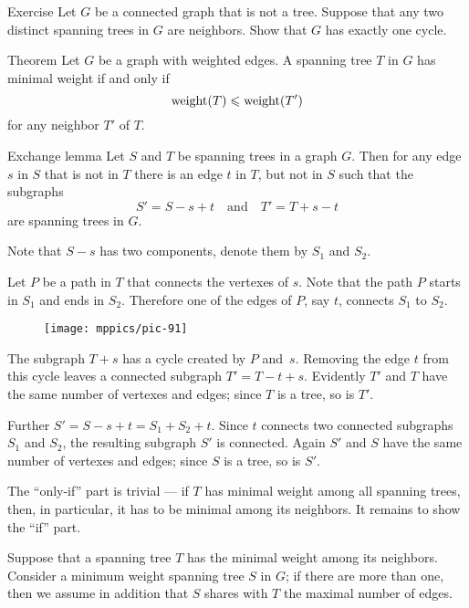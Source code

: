 \begin{thm}{Exercise}
Let $G$ be a connected graph that is not a tree.
Suppose that any two distinct spanning trees in $G$ are neighbors.
Show that $G$ has exactly one cycle.
\end{thm}

\begin{thm}{Theorem}\label{thm:mst-iff}
Let $G$ be a graph with weighted edges.
A spanning tree $T$ in $G$ has minimal weight if and only if
\[\mathop{\rm weight}\nolimits(T)\leqslant \mathop{\rm weight}\nolimits(T')\]
for any neighbor $T'$ of $T$.
\end{thm}

\begin{thm}{Exchange lemma}
Let $S$ and $T$ be spanning trees in a graph $G$.
Then for any edge $s$ in $S$ that is not in $T$ there is an edge $t$ in $T$, but not in $S$ such that the subgraphs
\[S'=S-s+t\quad\text{and}\quad T'=T+s-t\]
are spanning trees in $G$.
\end{thm}

Note that $S-s$ has two components, denote them by $S_1$ and $S_2$.

Let $P$ be a path in $T$ that connects the vertexes of $s$.
Note that the path $P$ starts in $S_1$ and ends in $S_2$.
Therefore one of the edges of $P$, say $t$, connects $S_1$ to $S_2$.

\begin{figure}[h!]
\vskip-0mm
\centering
\texttt{[image: mppics/pic-91]}
\end{figure}

The subgraph $T+s$ has a cycle created by $P$ and~$s$.
Removing the edge $t$ from this cycle leaves a connected subgraph $T'=T-t+s$.
Evidently $T'$ and $T$ have the same number of vertexes and edges;
since $T$ is a tree, so is $T'$.

Further $S'=S-s+t=S_1+S_2+t$.
Since $t$ connects two connected subgraphs $S_1$ and $S_2$, the resulting subgraph $S'$ is connected.
Again $S'$ and $S$ have the same number of vertexes and edges;
since $S$ is a tree, so is $S'$.
\qeds

 The ``only-if'' part is trivial --- if $T$ has minimal weight among all spanning trees, then, in particular, it has to be minimal among its neighbors. 
It remains to show the ``if'' part.

Suppose that a spanning tree $T$ has the minimal weight among its neighbors.
Consider a minimum weight spanning tree $S$ in $G$;
if there are more than one, then
we assume in addition that $S$ shares with $T$ the maximal number of edges. 

